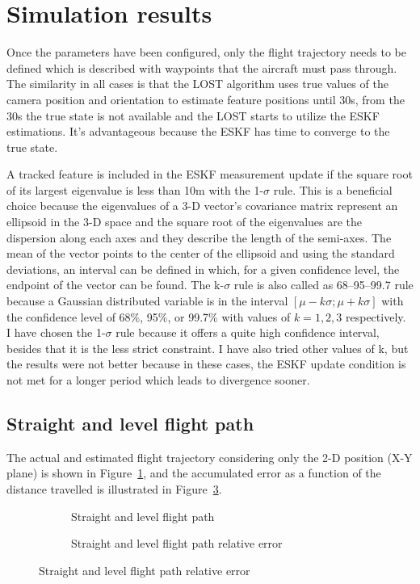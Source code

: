 \section{Simulation results}

Once the parameters have been configured, only the flight trajectory needs to be defined which is described with waypoints that the aircraft must pass through. The similarity in all cases is that the LOST algorithm uses true values of the camera position and orientation to estimate feature positions until 30\si{\second}, from the 30\si{\second} the true state is not available and the LOST starts to utilize the ESKF estimations. It's advantageous because the ESKF has time to converge to the true state.

A tracked feature is included in the ESKF measurement update if the square root of its largest eigenvalue is less than 10\si{\meter} with the 1-$\sigma$ rule. This is a beneficial choice because the eigenvalues of a 3-D vector's covariance matrix represent an ellipsoid in the 3-D space and the square root of the eigenvalues are the dispersion along each axes and they describe the length of the semi-axes. The mean of the vector points to the center of the ellipsoid and using the standard deviations, an interval can be defined in which, for a given confidence level, the endpoint of the vector can be found. The k-$\sigma$ rule is also called as 68--95--99.7 rule because a Gaussian distributed variable is in the interval $[\mu-k\sigma;\mu+k\sigma]$ with the confidence level of 68\%, 95\%, or 99.7\% with values of $k=1, 2, 3$ respectively. I have chosen the 1-$\sigma$ rule because it offers a quite high confidence interval, besides that it is the less strict constraint. I have also tried other values of k, but the results were not better because in these cases, the ESKF update condition is not met for a longer period which leads to divergence sooner.

\subsection{Straight and level flight path}

The actual and estimated flight trajectory considering only the 2-D position (X-Y plane) is shown in Figure~\ref{fig:straight-level}, and the accumulated error as a function of the distance travelled is illustrated in Figure~\ref{fig:straight-level-error}.

\begin{figure}[H]
    \centering
    \begin{subfigure}{0.45\textwidth}
        
        \caption{Straight and level flight path}\label{fig:straight-level}
    \end{subfigure}
    \begin{subfigure}{0.45\textwidth}
        
        \caption{Straight and level flight path relative error}\label{fig:straight-level-error}
    \end{subfigure}
\end{figure}


